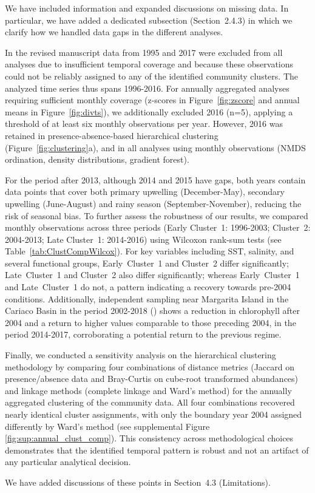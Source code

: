 \documentclass[12pt,english]{reviewresponse}
\begin{document}
\begin{revresponse}
    We have included information and expanded discussions on missing data. In particular, we have added a dedicated subsection (Section~2.4.3) in which we clarify how we handled data gaps in the different analyses.

    In the revised manuscript data from 1995 and 2017 were excluded from all analyses due to insufficient temporal coverage and because these observations could not be reliably assigned to any of the identified community clusters. The analyzed time series thus spans 1996-2016. For annually aggregated analyses requiring sufficient monthly coverage (z-scores in Figure~\ref{fig:zscore} and annual means in Figure~\ref{fig:divts}), we additionally excluded 2016 (n=5), applying a threshold of at least six monthly observations per year. However, 2016 was retained in presence-absence-based hierarchical clustering (Figure~\ref{fig:clustering}a), and in all analyses using monthly observations (NMDS ordination, density distributions, gradient forest). 
    
    For the period after 2013, although 2014 and 2015 have gaps, both years contain data points that cover both primary upwelling (December-May), secondary upwelling (June-August) and rainy season (September-November), reducing the risk of seasonal bias. To further assess the robustness of our results, we compared monthly observations across three periods (Early Cluster~1: 1996-2003; Cluster~2: 2004-2013; Late Cluster~1: 2014-2016) using Wilcoxon rank-sum tests (see Table~\ref{tab:ClustCompWilcox}). For key variables including SST, salinity, and several functional groups, Early~Cluster~1 and Cluster~2 differ significantly; Late~Cluster~1 and Cluster~2 also differ significantly; whereas Early~Cluster~1 and Late~Cluster~1 do not, a pattern indicating a recovery towards pre-2004 conditions. Additionally, independent sampling near Margarita Island in the Cariaco Basin in the period 2002-2018 (\cite{gomez_gaspar_variacion_2025}) shows a reduction in chlorophyll after 2004 and a return to higher values comparable to those preceding 2004, in the period 2014-2017, corroborating a potential return to the previous regime.

    Finally, we conducted a sensitivity analysis on the hierarchical clustering methodology by comparing four combinations of distance metrics (Jaccard on presence/absence data and Bray-Curtis on cube-root transformed abundances) and linkage methods (complete linkage and Ward's method) for the annually aggregated clustering of the community data. All four combinations recovered nearly identical cluster assignments, with only the boundary year 2004 assigned differently by Ward's method (see supplemental Figure \ref{fig:sup:annual_clust_comp}). This consistency across methodological choices demonstrates that the identified temporal pattern is robust and not an artifact of any particular analytical decision.
    
    We have added discussions of these points in Section~4.3 (Limitations).
\end{revresponse}
\end{document}

